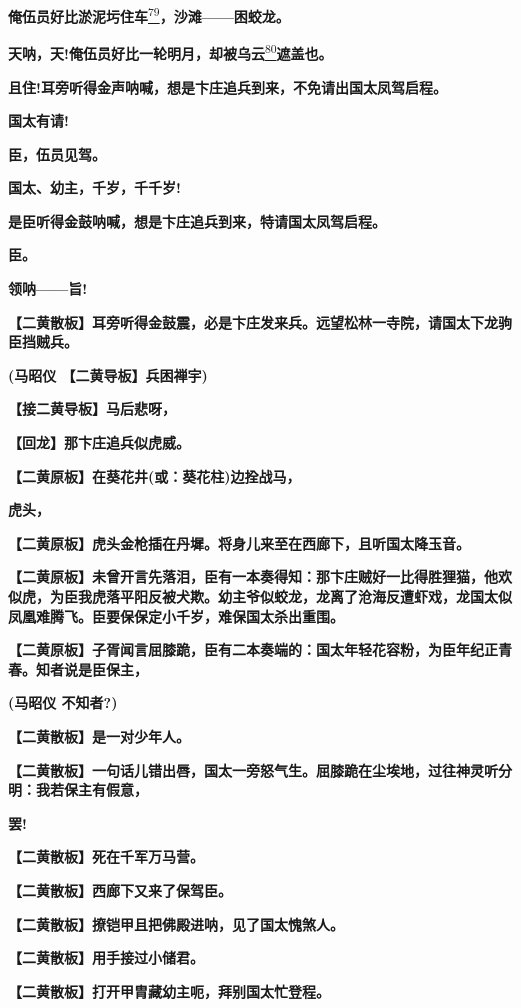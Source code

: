 \textbf{俺伍员好比淤泥圬住车}\protect\hyperlink{fn79}{\textsuperscript{79}}\textbf{，沙滩------困蛟龙。}

\textbf{天呐，天!俺伍员好比一轮明月，却被乌云}\protect\hyperlink{fn80}{\textsuperscript{80}}\textbf{遮盖也。}

\textbf{且住!耳旁听得金声呐喊，想是卞庄追兵到来，不免请出国太凤驾启程。}

\textbf{国太有请!}

\textbf{臣，伍员见驾。}

\textbf{国太、幼主，千岁，千千岁!}

\textbf{是臣听得金鼓呐喊，想是卞庄追兵到来，特请国太凤驾启程。}

\textbf{臣。}

\textbf{领呐------旨!}

\textbf{【二黄散板】耳旁听得金鼓震，必是卞庄发来兵。远望松林一寺院，请国太下龙驹臣挡贼兵。}

\textbf{(马昭仪 【二黄导板】兵困禅宇)}

\textbf{【接二黄导板】马后悲呀，}

\textbf{【回龙】那卞庄追兵似虎威。}

\textbf{【二黄原板】在葵花井(或：葵花柱)边拴战马，}

\textbf{虎头，}

\textbf{【二黄原板】虎头金枪插在丹墀。将身儿来至在西廊下，且听国太降玉音。}

\textbf{【二黄原板】未曾开言先落泪，臣有一本奏得知：那卞庄贼好一比得胜狸猫，他欢似虎，为臣我虎落平阳反被犬欺。幼主爷似蛟龙，龙离了沧海反遭虾戏，龙国太似凤凰难腾飞。臣要保保定小千岁，难保国太杀出重围。}

\textbf{【二黄原板】子胥闻言屈膝跪，臣有二本奏端的：国太年轻花容粉，为臣年纪正青春。知者说是臣保主，}

\textbf{(马昭仪 不知者?)}

\textbf{【二黄散板】是一对少年人。}

\textbf{【二黄散板】一句话儿错出唇，国太一旁怒气生。屈膝跪在尘埃地，过往神灵听分明：我若保主有假意，}

\textbf{罢!}

\textbf{【二黄散板】死在千军万马营。}

\textbf{【二黄散板】西廊下又来了保驾臣。}

\textbf{【二黄散板】撩铠甲且把佛殿进呐，见了国太愧煞人。}

\textbf{【二黄散板】用手接过小储君。}

\textbf{【二黄散板】打开甲胄藏幼主呃，拜别国太忙登程。}

